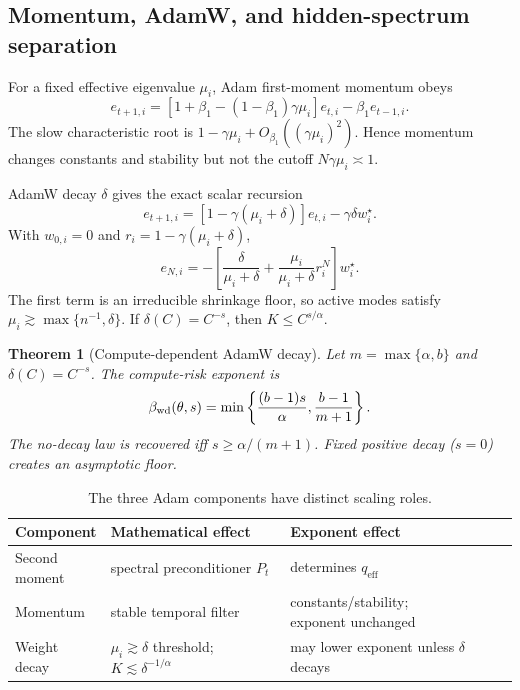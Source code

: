 \documentclass[letterpaper]{article} %
\newtheorem{theorem}{Theorem}
\newcommand{\qeff}{q_{\mathrm{eff}}}
\begin{document}
\subsection{Momentum, AdamW, and hidden-spectrum separation}

For a fixed effective eigenvalue $\mu_i$, Adam first-moment momentum obeys
\[
 e_{t+1,i}
 =
 [1+\beta_1-(1-\beta_1)\gamma\mu_i]e_{t,i}
 -\beta_1e_{t-1,i}.
\]
The slow characteristic root is
$1-\gamma\mu_i+O_{\beta_1}((\gamma\mu_i)^2)$.  Hence momentum changes constants and stability but not the cutoff $N\gamma\mu_i\asymp1$.

AdamW decay $\delta$ gives the exact scalar recursion
\[
 e_{t+1,i}=[1-\gamma(\mu_i+\delta)]e_{t,i}
 -\gamma\delta w_i^\star.
\]
With $w_{0,i}=0$ and $r_i=1-\gamma(\mu_i+\delta)$,
\[
 e_{N,i}
 =-\left[
 \frac{\delta}{\mu_i+\delta}
 +\frac{\mu_i}{\mu_i+\delta}r_i^N
 \right]w_i^\star.
\]
The first term is an irreducible shrinkage floor, so active modes satisfy
$\mu_i\gtrsim\max\{n^{-1},\delta\}$.  If $\delta(C)=C^{-s}$, then
$K\le C^{s/\alpha}$.

\begin{theorem}[Compute-dependent AdamW decay]
\label{thm:adamw}
Let $m=\max\{\alpha,b\}$ and $\delta(C)=C^{-s}$.  The compute-risk exponent is
\[
 \beta_{\rm wd}(\theta,s)=
 \min\left\{\frac{(b-1)s}{\alpha},
 \frac{b-1}{m+1}\right\}.
\]
The no-decay law is recovered iff $s\ge\alpha/(m+1)$.  Fixed positive decay ($s=0$) creates an asymptotic floor.
\end{theorem}


\begin{table}[t]
\centering
\small
\caption{The three Adam components have distinct scaling roles.}
\label{tab:adam-components}
\setlength{\tabcolsep}{4.5pt}
\begin{tabular}{@{}p{}p{}p{}@{}}
\toprule
Component & Mathematical effect & Exponent effect\\
\midrule
\shortstack[l]{Second\\moment} &
\shortstack[l]{spectral\\preconditioner $P_t$} & determines $\qeff$\\
Momentum & stable temporal filter &
\shortstack[l]{constants/stability;\\exponent unchanged}\\
\shortstack[l]{Weight\\decay} &
\shortstack[l]{$\mu_i\gtrsim\delta$ threshold;\\$K\lesssim\delta^{-1/\alpha}$} &
\shortstack[l]{may lower exponent\\unless $\delta$ decays}\\
\bottomrule
\end{tabular}
\end{table}
\end{document}
